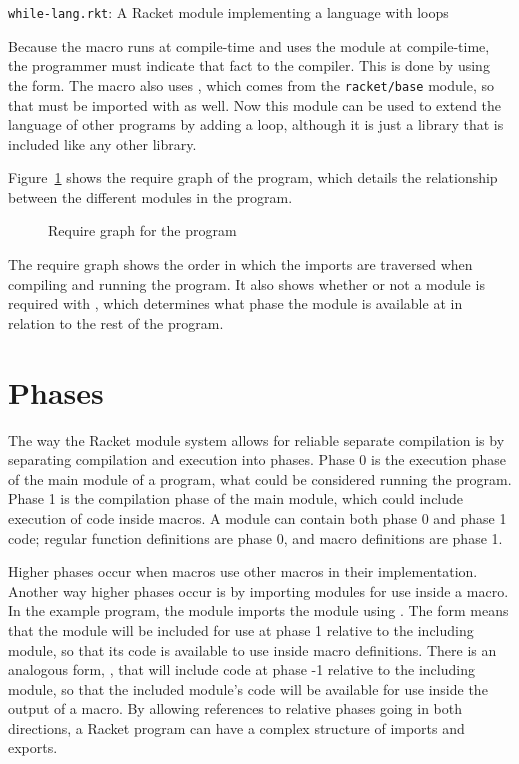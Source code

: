 \begin{listing}[tb]
  \inputminted{racket}{listings/while-lang.rkt}
  \caption{\texttt{while-lang.rkt}: A Racket module implementing a language with  loops}
  \label{lst:while-lang.rkt}
\end{listing}

Because the macro runs at compile-time and uses the  module at compile-time, the programmer must indicate that fact to the compiler.
This is done by using the  form. 
The macro also uses , which comes from the \texttt{racket/base} module, so that must be imported with  as well.
Now this module can be used to extend the language of other programs by adding a  loop, although it is just a library that is included like any other library.

Figure~\ref{fig:modules.tex} shows the require graph of the program, which details the relationship between the different modules in the program.
\begin{figure}
  
  \caption{Require graph for the  program}
  \label{fig:modules.tex}
\end{figure}
The require graph shows the order in which the imports are traversed when compiling and running the program.
It also shows whether or not a module is required with , which determines what phase the module is available at in relation to the rest of the program.

\section{Phases}

The way the Racket module system allows for reliable separate compilation is by separating compilation and execution into phases.
Phase 0 is the execution phase of the main module of a program, what could be considered running the program.
Phase 1 is the compilation phase of the main module, which could include execution of code inside macros. 
A module can contain both phase 0 and phase 1 code; regular function definitions are phase 0, and macro definitions are phase 1.

Higher phases occur when macros use other macros in their implementation.
Another way higher phases occur is by importing modules for use inside a macro.
In the example program, the  module imports the  module using .
The  form means that the module will be included for use at phase 1 relative to the including module, so that its code is available to use inside macro definitions.
There is an analogous form, , that will include code at phase -1 relative to the including module, so that the included module's code will be available for use inside the output of a macro. 
By allowing references to relative phases going in both directions, a Racket program can have a complex structure of imports and exports.

